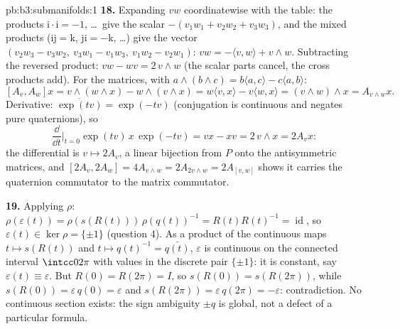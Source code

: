 \begin{solution}{pb:b3:submanifolds:1}
\textbf{18.} Expanding $vw$ coordinatewise with the table:
the products $\mathrm i\cdot\mathrm i = -1$, \dots\ give
the scalar $-(v_1w_1 + v_2w_2 + v_3w_3)$, and the mixed
products ($\mathrm{ij} = \mathrm k$, $\mathrm{ji} =
-\mathrm k$, \dots) give the vector $(v_2w_3 - v_3w_2,\
v_3w_1 - v_1w_3,\ v_1w_2 - v_2w_1)$: $vw = -\langle v,
w\rangle + v\wedge w$. Subtracting the reversed product:
$vw - wv = 2\,v\wedge w$ (the scalar parts cancel, the
cross products add). For the matrices, with $a\wedge(b\wedge
c) = b\langle a, c\rangle - c\langle a, b\rangle$:
\[
[A_v, A_w]x = v\wedge(w\wedge x) - w\wedge(v\wedge x)
= w\langle v, x\rangle - v\langle w, x\rangle
= (v\wedge w)\wedge x = A_{v\wedge w}x .
\]
Derivative: $\overline{\exp(tv)} = \exp(-tv)$ (conjugation
is continuous and negates pure quaternions), so
\[
\frac{\dd}{\dd t}\Bigr|_{t=0}\exp(tv)\,x\,\exp(-tv) = vx -
xv = 2\,v\wedge x = 2A_vx :
\]
the differential is $v \mapsto 2A_v$, a linear bijection
from $P$ onto the antisymmetric matrices, and $[2A_v, 2A_w]
= 4A_{v\wedge w} = 2A_{2v\wedge w} = 2A_{[v,w]}$ shows it
carries the quaternion commutator to the matrix
commutator.

\textbf{19.} Applying $\rho$: $\rho(\varepsilon(t)) =
\rho(s(R(t)))\,\rho(q(t))^{-1} = R(t)R(t)^{-1} =
\operatorname{id}$, so $\varepsilon(t) \in \ker\rho =
\{\pm1\}$ (question 4). As a product of the continuous maps
$t \mapsto s(R(t))$ and $t \mapsto q(t)^{-1} =
\bar{q(t)}$, $\varepsilon$ is continuous on the connected
interval $\intcc0{2\pi}$ with values in the discrete pair
$\{\pm1\}$: it is constant, say $\varepsilon(t) \equiv
\varepsilon$. But $R(0) = R(2\pi) = I$, so $s(R(0)) =
s(R(2\pi))$, while $s(R(0)) = \varepsilon\,q(0) =
\varepsilon$ and $s(R(2\pi)) = \varepsilon\,q(2\pi) =
-\varepsilon$: contradiction. No continuous section
exists: the sign ambiguity $\pm q$ is global, not a defect
of a particular formula.


\end{solution}
